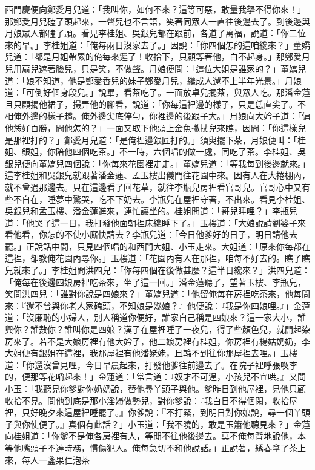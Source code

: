 西門慶便向鄭愛月兒道：「我叫你，如何不來？這等可惡，敢量我拏不得你來！」那鄭愛月兒磕了頭起來，一聲兒也不言語，笑著同眾人一直往後邊去了。到後邊與月娘眾人都磕了頭。看見李桂姐、吳銀兒都在跟前，各道了萬福，說道：「你二位來的早。」李桂姐道：「俺每兩日沒家去了。」因說：「你四個怎的這咱纔來？」董嬌兒道：「都是月姐帶累的俺每來遲了！收拾下，只顧等著他，白不起身。」那鄭愛月兒用扇兒遮著臉兒，只是笑，不做聲。月娘便問：「這位大姐是誰家的？」董嬌兒道：「娘不知道，他是鄭愛香兒的妹子鄭愛月兒，纔成人還不上半年光景。」月娘道：「可倒好個身段兒。」說畢，看茶吃了。一面放卓兒擺茶，與眾人吃。那潘金蓮且只顧揭他裙子，撮弄他的腳看，說道：「你每這裡邊的樣子，只是恁直尖了。不相俺外邊的樣子趫。俺外邊尖底停勻，你裡邊的後跟子大。」月娘向大妗子道：「偏他恁好百勝，問他怎的？」一面又取下他頭上金魚撇扙兒來瞧，因問：「你這樣兒是那裡打的？」鄭愛月兒道：「是俺裡邊銀匠打的。」須臾擺下茶，月娘便叫：「桂姐、銀姐，你陪他四個吃茶。」不一時，六個唱的做一處，同吃了茶。李桂姐、吳銀兒便向董嬌兒四個說：「你每來花園裡走走。」董嬌兒道：「等我每到後邊就來。」這李桂姐和吳銀兒就跟著潘金蓮、孟玉樓出儀門往花園中來。因有人在大捲棚內，就不曾過那邊去。只在這邊看了回花草，就往李瓶兒房裡看官哥兒。官哥心中又有些不自在，睡夢中驚哭，吃不下奶去。李瓶兒在屋裡守著，不出來。看見李桂姐、吳銀兒和孟玉樓、潘金蓮進來，連忙讓坐的。桂姐問道：「哥兒睡哩？」李瓶兒道：「他哭了這一日，我打發他面朝裡床纔睡下了。」玉樓道：「大娘說請劉婆子來看他看，你怎的不使小廝快請去？李瓶兒道：「今日他爹好的日子，明日請他去罷。」正說話中間，只見四個唱的和西門大姐、小玉走來。大姐道：「原來你每都在這裡，卻教俺花園內尋你。」玉樓道：「花園內有人在那裡，咱每不好去的。瞧了瞧兒就來了。」李桂姐問洪四兒：「你每四個在後做甚麼？這半日纔來？」洪四兒道：「俺每在後邊四娘房裡吃茶來，坐了這一回。」潘金蓮聽了，望著玉樓、李瓶兒，笑問洪四兒：「誰對你說是四娘來？」董嬌兒道：「他留俺每在房裡吃茶來，他每問來：『還不曾與你老人家磕頭，不知娘是幾娘？』他便說：『我是你四娘哩。』」金蓮道：「沒廉恥的小婦人，別人稱道你便好，誰家自己稱是四娘來？這一家大小，誰興你？誰數你？誰叫你是四娘？漢子在屋裡睡了一夜兒，得了些顏色兒，就開起染房來了。若不是大娘房裡有他大妗子，他二娘房裡有桂姐，你房裡有楊姑奶奶，李大姐便有銀姐在這裡，我那屋裡有他潘姥姥，且輪不到往你那屋裡去哩。」玉樓道：「你還沒曾見哩，今日早晨起來，打發他爹往前邊去了。在院子裡呼張喚李的，便那等花哨起來！」金蓮道：「常言道：『奴才不可逞，小孩兒不宜哄。』又問小玉：「我聽見你爹對你奶奶說，替他尋丫頭子與他。爹昨日到他屋裡，見他只顧收拾不見。問他到底是那小淫婦做勢兒，對你爹說：『我白日不得個閑，收拾屋裡，只好晚夕來這屋裡睡罷了。』你爹說：『不打緊，到明日對你娘說，尋一個丫頭子與你使便了。』真個有此話？」小玉道：「我不曉的，敢是玉簫他聽見來？」金蓮向桂姐道：「你爹不是俺各房裡有人，等閒不往他後邊去。莫不俺每背地說他，本等他嘴頭子不達時務，慣傷犯人。俺每急切不和他說話。」正說著，綉春拿了茶上來，每人一盞果仁泡茶 
